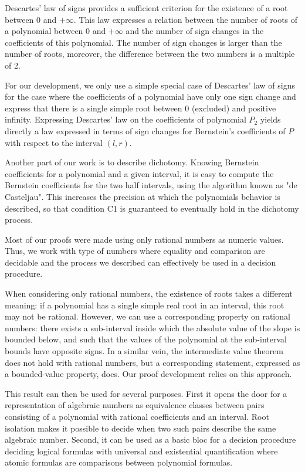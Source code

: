\documentclass{article}
\begin{document}
Descartes' law of signs provides a sufficient criterion for the existence
of a root between 0 and \(+\infty\).  This law expresses a relation between
the number of roots of a polynomial between 0 and \(+\infty\) and the number
of sign changes in the coefficients of this polynomial.  The number of sign
changes is larger than the number of roots, moreover, the difference between
the two numbers is a multiple of 2.

For our development, we only use a simple special case of Descartes' law
of signs for the case where the coefficients of a polynomial
have only one sign change and express that there is a single simple root
between 0 (excluded) and positive infinity.  Expressing Descartes' law on
the coefficients of polynomial \(P_2\) yields directly a law expressed in terms
of sign changes for Bernstein's coefficients of \(P\) with respect to the
interval \((l,r)\).

Another part of our work is to describe dichotomy.  Knowing Bernstein
coefficients for a polynomial and a given interval, it is easy to
compute the Bernstein coefficients for the two half intervals, using
the algorithm known as "de Casteljau".  This increases the precision
at which the polynomials behavior is described, so that condition C1
is guaranteed to eventually hold in the dichotomy process.

Most of our proofs were made using only rational numbers as numeric
values.  Thus, we work with type of numbers where equality and
comparison are decidable and the process we described can effectively
be used in a decision procedure.

When considering only rational numbers, the existence of roots takes a
different meaning: if a polynomial has a single simple real root in an
interval, this root may not be rational.  However, we can use a
corresponding property on rational numbers: there exists a
sub-interval inside which the absolute value of the slope is bounded
below, and such that the values of the polynomial at the sub-interval
bounds have opposite signs.  In a similar vein, the intermediate value
theorem does not hold with rational numbers, but a corresponding
statement, expressed as a bounded-value property, does.  Our proof
development relies on this approach.

This result can then be used for several purposes.  First it opens the
door for a representation of algebraic numbers as equivalence classes
between pairs consisting of a polynomial with rational coefficients
and an interval.  Root isolation makes it possible to decide when two
such pairs describe the same algebraic number.  Second, it can be used
as a basic bloc for a decision procedure deciding logical formulas
with universal and existential quantification where atomic formulas
are comparisons between polynomial formulas.
\end{document}
